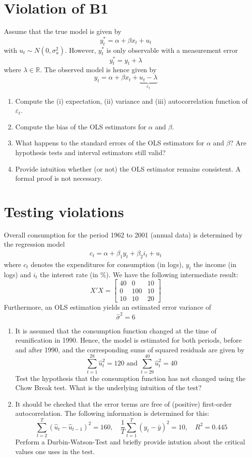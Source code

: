 \documentclass{article}
\begin{document}
\section{Violation of B1}
Assume that the true model is given by
$$y_t^\ast = \alpha + \beta x_t + u_t$$
with $u_t \sim N(0,\sigma_u^2)$. However, $y_t^\ast$ is only observable with a measurement error
$$y_t^\ast = y_t + \lambda$$
where $\lambda \in \mathbb{R}$. The observed model is hence given by
$$ y_t = \alpha + \beta x_t + \underbrace{u_t - \lambda}_{\varepsilon_t}$$
\begin{enumerate}[label=(\alph*)]
	\item Compute the (i) expectation, (ii) variance and (iii) autocorrelation function of $\varepsilon_t$.
	\item Compute the bias of the OLS estimators for $\alpha$ and $\beta$.
	\item What happens to the standard errors of the OLS estimators for $\alpha$ and $\beta$? Are hypothesis tests and interval estimators still valid? 
	\item Provide intuition whether (or not) the OLS estimator remains consistent. A formal proof is not necessary.	
\end{enumerate}

\newpage

\section{Testing violations}
Overall consumption for the period 1962 to 2001 (annual data) is determined by the regression model
\begin{align*}
c_t = \alpha + \beta_1 y_{t} + \beta_2 i_{t} + u_t
\end{align*}
where $c_t$ denotes the expenditures for consumption (in logs), $y_t$ the income (in logs) and $i_t$ the interest rate (in \%). We have the following intermediate result:
$$X'X = \begin{bmatrix}40 & 0 & 10\\0 & 100 & 10\\10 & 10 & 20\end{bmatrix}$$
Furthermore, an OLS estimation yields an estimated error variance of
$$\hat{\sigma}^2 = 6$$
\begin{enumerate}[label=(\alph*)]
	\item It is assumed that the consumption function changed at the time of reunification in 1990. Hence, the model is estimated for both periods, before and after 1990, and the corresponding sums of squared residuals are given by
	$$\sum_{t=1}^{28} \hat{u}_t^2 = 120 \text{ and } \sum_{t=29}^{40} \hat{u}_t^2 = 40$$
	Test the hypothesis that the consumption function has not changed using the Chow Break test. What is the underlying intuition of the test?
	\item It should be checked that the error terms are free of (positive) first-order autocorrelation. The following information is determined for this:
	$$\sum_{t=2}^T (\hat{u}_t - \hat{u}_{t-1})^2 = 160,\quad \frac{1}{T} \sum_{t=1}^T (y_t - \bar{y})^2=10, \quad R^2 = 0.445$$
	Perform a Durbin-Watson-Test and briefly provide intution about the critical values one uses in the test.
\end{enumerate}
\end{document}

